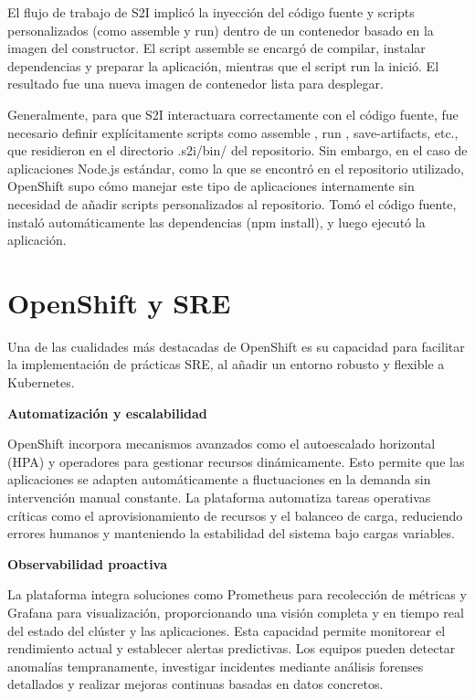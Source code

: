 El flujo de trabajo de S2I implicó la inyección del código fuente y scripts personalizados (como assemble y run) dentro de un contenedor basado en la imagen del constructor. El script assemble se encargó de compilar, instalar dependencias y preparar la aplicación, mientras que el script run la inició. El resultado fue una nueva imagen de contenedor lista para desplegar.

Generalmente, para que S2I interactuara correctamente con el código fuente, fue necesario definir explícitamente scripts como assemble , run , save-artifacts, etc., que residieron en el directorio .s2i/bin/ del repositorio. Sin embargo, en el caso de aplicaciones Node.js estándar, como la que se encontró en el repositorio utilizado, OpenShift supo cómo manejar este tipo de aplicaciones internamente sin necesidad de añadir scripts personalizados al repositorio. Tomó el código fuente, instaló automáticamente las dependencias (npm install), y luego ejecutó la aplicación.



\section{OpenShift y SRE}
Una de las cualidades más destacadas de OpenShift es su capacidad para facilitar la implementación de prácticas SRE, al añadir un entorno robusto y flexible a Kubernetes.

\vspace{0.5cm}
\noindent\textbf{Automatización y escalabilidad}

OpenShift incorpora mecanismos avanzados como el autoescalado horizontal (HPA) y operadores para gestionar recursos dinámicamente. Esto permite que las aplicaciones se adapten automáticamente a fluctuaciones en la demanda sin intervención manual constante. La plataforma automatiza tareas operativas críticas como el aprovisionamiento de recursos y el balanceo de carga, reduciendo errores humanos y manteniendo la estabilidad del sistema bajo cargas variables.

\vspace{0.5cm}
\noindent\textbf{Observabilidad proactiva}

La plataforma integra soluciones como Prometheus para recolección de métricas y Grafana para visualización, proporcionando una visión completa y en tiempo real del estado del clúster y las aplicaciones. Esta capacidad permite monitorear el rendimiento actual y establecer alertas predictivas. Los equipos pueden detectar anomalías tempranamente, investigar incidentes mediante análisis forenses detallados y realizar mejoras continuas basadas en datos concretos.

